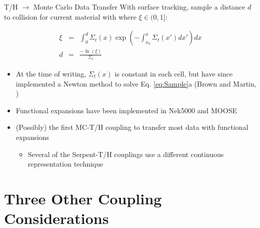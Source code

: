 \documentclass[10pt]{beamer}
\begin{document}
\begin{frame}{T/H \(\rightarrow\) Monte Carlo Data Transfer}
With surface tracking, sample a distance \(d\) to collision for current material with where \(\xi\in(0,1]\):

\begin{subequations}
\label{eq:Sample}
\begin{eqnarray}
\xi&=&\int_0^d\Sigma_t(x)\exp{\left(-\int_{x_0}^x\Sigma_t(x')dx'\right)}dx\\
d&=&\frac{-\ln{(\xi)}}{\Sigma_t}
\end{eqnarray}
\end{subequations}

\vspace{0.25cm}
\begin{itemize}
\item At the time of writing, \(\Sigma_t(x)\) is constant in each cell, but have since implemented a Newton method to solve Eq. \eqref{eq:Sample}a (Brown and Martin, \cite{brown_martin_direct})
\item Functional expansions have been implemented in Nek5000 and MOOSE
\item (Possibly) the first MC-T/H coupling to transfer most data with functional expansions
	\begin{itemize}
	\item Several of the Serpent-T/H couplings use a different continuous representation technique
	\end{itemize}
\end{itemize}
\end{frame}

\section{Three Other Coupling Considerations}
\end{document}
